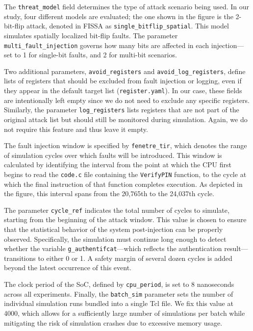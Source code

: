 The \texttt{threat\_model} field determines the type of attack scenario being used. In our study, four different models are evaluated; the one shown in the figure is the 2-bit-flip attack, denoted in FISSA as \texttt{single\_bitflip\_spatial}. This model simulates spatially localized bit-flip faults. The parameter \texttt{multi\_fault\_injection} governs how many bits are affected in each injection—set to 1 for single-bit faults, and 2 for multi-bit scenarios.

Two additional parameters, \texttt{avoid\_registers} and \texttt{avoid\_log\_registers}, define lists of registers that should be excluded from fault injection or logging, even if they appear in the default target list (\texttt{register.yaml}). In our case, these fields are intentionally left empty since we do not need to exclude any specific registers. Similarly, the parameter \texttt{log\_registers} lists registers that are not part of the original attack list but should still be monitored during simulation. Again, we do not require this feature and thus leave it empty.

The fault injection window is specified by \texttt{fenetre\_tir}, which denotes the range of simulation cycles over which faults will be introduced. This window is calculated by identifying the interval from the point at which the CPU first begins to read the \texttt{code.c} file containing the \texttt{VerifyPIN} function, to the cycle at which the final instruction of that function completes execution. As depicted in the figure, this interval spans from the 20,765th to the 24,037th cycle.

The parameter \texttt{cycle\_ref} indicates the total number of cycles to simulate, starting from the beginning of the attack window. This value is chosen to ensure that the statistical behavior of the system post-injection can be properly observed. Specifically, the simulation must continue long enough to detect whether the variable \texttt{g\_authentifcat}—which reflects the authentication result—transitions to either 0 or 1. A safety margin of several dozen cycles is added beyond the latest occurrence of this event.

The clock period of the SoC, defined by \texttt{cpu\_period}, is set to 8 nanoseconds across all experiments. Finally, the \texttt{batch\_sim} parameter sets the number of individual simulation runs bundled into a single Tcl file. We fix this value at 4000, which allows for a sufficiently large number of simulations per batch while mitigating the risk of simulation crashes due to excessive memory usage.

